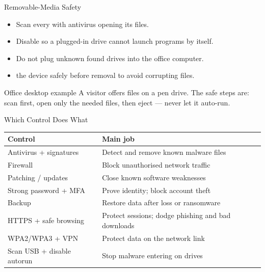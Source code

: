 \documentclass[aspectratio=169]{beamer}
\begin{document}
\begin{frame}{Removable-Media Safety}
  \begin{itemize}
    \item Scan every  with antivirus
       opening its files.
    \item Disable  so a plugged-in drive cannot launch programs
      by itself.
    \item Do not plug unknown found drives into the office computer.
    \item {} the device safely before removal to avoid corrupting
      files.
  \end{itemize}
  \begin{block}{Office desktop example}
    A visitor offers files on a pen drive. The safe steps are: scan first,
    open only the needed files, then eject --- never let it auto-run.
  \end{block}
\end{frame}

\begin{frame}{Which Control Does What}
  \begin{center}
    \begin{tabular}{ll}
      \toprule
      \textbf{Control} & \textbf{Main job} \\
      \midrule
      Antivirus + signatures & Detect and remove known malware files \\
      Firewall & Block unauthorised network traffic \\
      Patching / updates & Close known software weaknesses \\
      Strong password + MFA & Prove identity; block account theft \\
      Backup & Restore data after loss or ransomware \\
      HTTPS + safe browsing & Protect sessions; dodge phishing and bad downloads \\
      WPA2/WPA3 + VPN & Protect data on the network link \\
      Scan USB + disable autorun & Stop malware entering on drives \\
      \bottomrule
    \end{tabular}
  \end{center}
  \vspace{0.2cm}
\end{frame}
\end{document}
